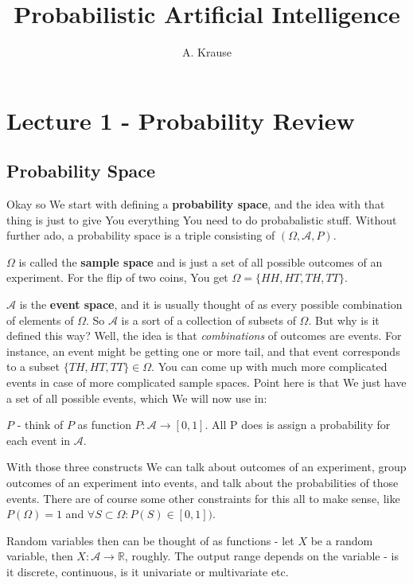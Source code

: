 \documentclass{article}
\begin{document}
\title{Probabilistic Artificial Intelligence}
\author{A. Krause}
\date{}

\maketitle

\section{Lecture 1 - Probability Review}

	\subsection{Probability Space}

		Okay so We start with defining a \textbf{probability space}, and the idea with that thing is just to give You everything You need to do probabalistic stuff. Without further ado, a probability space is a triple consisting of $(\Omega, \mathcal{A}, P)$.
		
		$\Omega$ is called the \textbf{sample space} and is just a set of all possible outcomes of an experiment. For the flip of two coins, You get $\Omega = \{HH, HT, TH, TT \}$.
		
		$\mathcal{A}$ is the \textbf{event space}, and it is usually thought of as every possible combination of elements of $\Omega$. So $\mathcal{A}$ is a sort of a collection of subsets of $\Omega$. But why is it defined this way? Well, the idea is that \textit{combinations} of outcomes are events. For instance, an event might be getting one or more  tail, and that event corresponds to a subset $\{TH, HT, TT \}\in\Omega$. You can come up with much more complicated events in case of more complicated sample spaces. Point here is that We just have a set of all possible events, which We will now use in:
		
		$P$ - think of $P$ as function $P:\mathcal{A}\to[0, 1]$. All P does is assign a probability for each event in $\mathcal{A}$. 
		
		With those three constructs We can talk about outcomes of an experiment, group outcomes of an experiment into events, and talk about the probabilities of those events. There are of course some other constraints for this all to make sense, like $P(\Omega)=1$ and $\forall S\subset\Omega: P(S)\in[0, 1])$.
		
		Random variables then can be thought of as functions - let $X$ be a random variable, then $X:\mathcal{A}\to\mathbb{R}$, roughly. The output range depends on the variable - is it discrete, continuous, is it univariate or multivariate etc.
		
\end{document}
